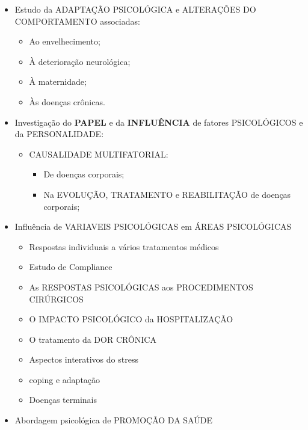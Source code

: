 \documentclass[
]{book}
\providecommand{\tightlist}{%
  \setlength{\itemsep}{0pt}\setlength{\parskip}{0pt}}
\begin{document}
\begin{itemize}
  \begin{itemize}
  \tightlist
  \item
    Estudo da ADAPTAÇÃO PSICOLÓGICA e ALTERAÇÕES DO COMPORTAMENTO associadas:

    \begin{itemize}
    \tightlist
    \item
      Ao envelhecimento;
    \item
      À deterioração neurológica;
    \item
      À maternidade;
    \item
      Às doenças crônicas.
    \end{itemize}
  \item
    Investigação do \textbf{PAPEL} e da \textbf{INFLUÊNCIA} de fatores PSICOLÓGICOS e da PERSONALIDADE:

    \begin{itemize}
    \tightlist
    \item
      CAUSALIDADE MULTIFATORIAL:

      \begin{itemize}
      \tightlist
      \item
        De doenças corporais;
      \item
        Na EVOLUÇÃO, TRATAMENTO e REABILITAÇÃO de doenças corporais;
      \end{itemize}
    \end{itemize}
  \item
    Influência de VARIAVEIS PSICOLÓGICAS em ÁREAS PSICOLÓGICAS

    \begin{itemize}
    \tightlist
    \item
      Respostas individuais a vários tratamentos médicos
    \item
      Estudo de Compliance
    \item
      As RESPOSTAS PSICOLÓGICAS aos PROCEDIMENTOS CIRÚRGICOS
    \item
      O IMPACTO PSICOLÓGICO da HOSPITALIZAÇÃO
    \item
      O tratamento da DOR CRÔNICA
    \item
      Aspectos interativos do stress
    \item
      coping e adaptação
    \item
      Doenças terminais
    \end{itemize}
  \item
    Abordagem psicológica de PROMOÇÃO DA SAÚDE


\end{itemize}
\end{itemize}
\end{document}
